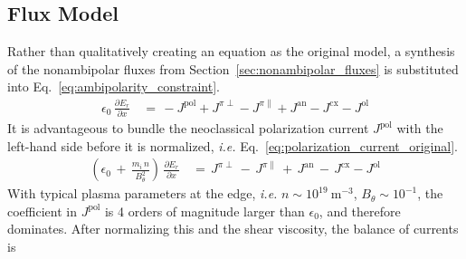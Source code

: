 \subsection{Flux Model}\label{ssec:flux_Z_equation}
Rather than qualitatively creating an equation as the original model, a synthesis of the nonambipolar fluxes from Section~\ref{sec:nonambipolar_fluxes} is substituted into Eq.~\ref{eq:ambipolarity_constraint}.
\begin{align}
	\epsilon_0 \, \frac{\partial E_r}{\partial x} \,&=\, -J^\text{pol}
		+ J^{\pi\perp} - J^{\pi\parallel} + J^\text{an} - J^\text{cx}
		- J^\text{ol} \label{eq:current_sum}
\end{align}
It is advantageous to bundle the neoclassical polarization current $J^\text{pol}$ with the left-hand side before it is normalized, \emph{i.e.} Eq.~\ref{eq:polarization_current_original}.
\begin{align} %
	\left(\epsilon_0 \,+\, \frac{m_i \, n}{B_\theta^2}\right) \,
	\frac{\partial E_r}{\partial x} \,&=\, J^{\pi\perp} \,-\, J^{\pi\parallel} \,+\, J^\text{an} \,-\, J^\text{cx} - J^\text{ol}
\end{align}
With typical plasma parameters at the edge, \emph{i.e.} $n \sim 10^{19}~\text{m}^{-3}$, $B_\theta \sim 10^{-1}$, the coefficient in $J^\text{pol}$ is 4 orders of magnitude larger than $\epsilon_0$, and therefore dominates.
After normalizing this and the shear viscosity, the balance of currents is
